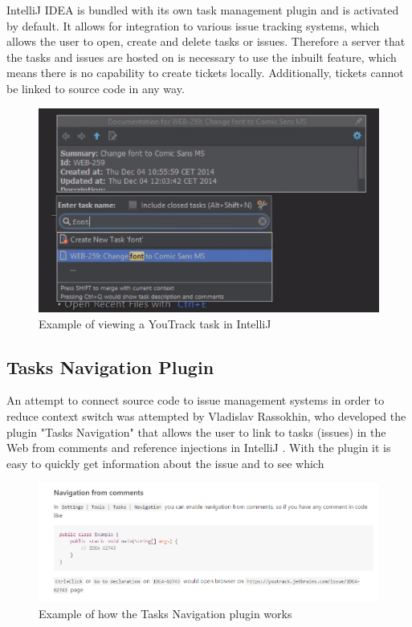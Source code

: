 \documentclass{4thYearProject}
\begin{document}
IntelliJ IDEA is bundled with its own task management plugin and is activated by default. It allows for integration to various issue tracking systems, which allows the user to open, create and delete tasks or issues. Therefore a server that the tasks and issues are hosted on is necessary to use the inbuilt feature, which means there is no capability to create tickets locally. Additionally, tickets cannot be linked to source code in any way.

\begin{figure}[H]
\includegraphics[scale=0.5]{IntelliJ_Tasks}
\centering
\caption{Example of viewing a YouTrack task in IntelliJ}\label{intellijtask}
\label{fig:intellijtask}
\end{figure}

\subsection{Tasks Navigation Plugin}

An attempt to connect source code to issue management systems in order to reduce context switch was attempted by Vladislav Rassokhin, who developed the plugin "Tasks Navigation" that allows the user to link to tasks (issues) in the Web from comments and reference injections in IntelliJ \cite{tasksnavigation}. With the plugin it is easy to quickly get information about the issue and to see which 

\begin{figure}[H]
\includegraphics[scale=0.6]{Tasks_Navigation_Plugin}
\centering
\caption{Example of how the Tasks Navigation plugin works}\label{tasksnavigation}
\label{fig:tasksnavigation}
\end{figure}
\end{document}
